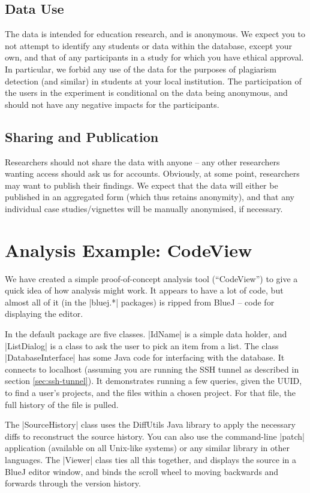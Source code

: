 \documentclass{report}
\begin{document}
\section{Data Use}

The data is intended for education research, and is anonymous.  We expect you
to not attempt to identify any students or data within the database, except
your own, and that of any participants in a study for which you have ethical
approval.  In particular, we forbid any use of the data for the purposes of
plagiarism detection (and similar) in students at your local institution.  The
participation of the users in the experiment is conditional on the data being
anonymous, and should not have any negative impacts for the participants.

\section{Sharing and Publication}

Researchers should not share the data with anyone -- any other researchers
wanting access should ask us for accounts.  Obviously, at some point,
researchers may want to publish their findings.  We expect that the data will
either be published in an aggregated form (which thus retains anonymity), and
that any individual case studies/vignettes will be manually anonymised, if
necessary.

\chapter{Analysis Example: CodeView}
\label{sec:example_codeview}

We have created a simple proof-of-concept analysis tool (``CodeView'') to give a quick idea
of how analysis might work.  It appears to have a lot of code, but almost all
of it (in the |bluej.*| packages) is ripped from BlueJ -- code for displaying
the editor.

In the default package are five classes.  |IdName| is a simple data holder,
and |ListDialog| is a class to ask the user to pick an item from a list.  The
class |DatabaseInterface| has some Java code for interfacing with the
database.  It connects to localhost (assuming you are running the SSH tunnel
as described in section \ref{sec:ssh-tunnel}).  It demonstrates running a few
queries, given the UUID, to find a user's projects, and the files within a
chosen project.  For that file, the full history of the file is pulled.

The |SourceHistory| class uses the DiffUtils Java library to apply the
necessary diffs to reconstruct the source history.  You can also use the
command-line |patch| application (available on all Unix-like systems) or any
similar library in other languages.  The |Viewer| class ties all this
together, and displays the source in a BlueJ editor window, and binds the
scroll wheel to moving backwards and forwards through the version history.
\end{document}
